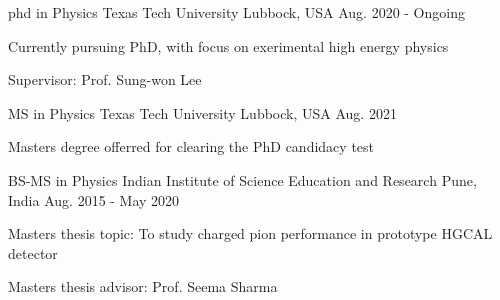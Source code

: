 

\begin{cventries}
  \cventry
    {phd in Physics} %
    {Texas Tech University} %
    {Lubbock, USA} %
    {Aug. 2020 - Ongoing} %
    {
      \begin{cvitems} %
      \item {Currently pursuing PhD, with focus on exerimental high energy physics}
      \item {Supervisor: Prof. Sung-won Lee}
      \end{cvitems}
    }


  \cventry
    {MS in Physics} %
    {Texas Tech University} %
    {Lubbock, USA} %
    {Aug. 2021} %
    {
      \begin{cvitems} %
        \item {Masters degree offerred for clearing the PhD candidacy test}
      \end{cvitems}
    }

  \cventry
    {BS-MS in Physics} %
    {Indian Institute of Science Education and Research} %
    {Pune, India} %
    {Aug. 2015 - May 2020} %
    {
      \begin{cvitems} %
        \item {Masters thesis topic: To study charged pion performance in prototype HGCAL detector}
        \item {Masters thesis advisor: Prof. Seema Sharma}
      \end{cvitems}
    }

\end{cventries}
